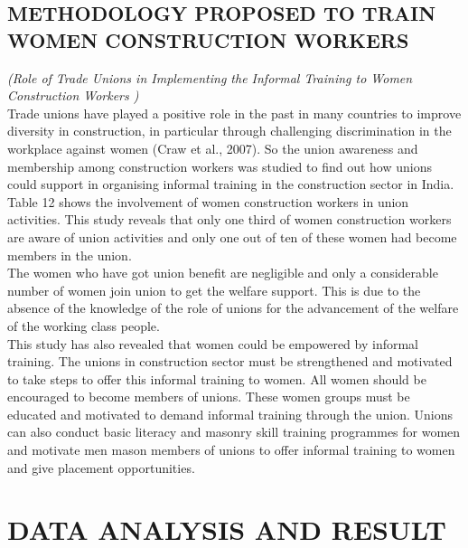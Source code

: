 \documentclass[12pt]{report}
\begin{document}
	
	\section{METHODOLOGY  PROPOSED  TO  TRAIN  WOMEN  CONSTRUCTION  WORKERS }
	\textit{(Role  of  Trade  Unions  in  Implementing  the  Informal  Training  to  Women  Construction Workers )}\\
	
	Trade  unions  have  played  a  positive  role  in  the  past  in  many  countries  to  improve diversity  in  construction,  in  particular  through  challenging  discrimination  in  the workplace  against  women  (Craw  et  al.,  2007).    So  the  union  awareness  and  membership among  construction  workers  was  studied  to  find  out  how  unions  could  support  in organising  informal  training  in  the  construction  sector  in  India.  Table  12  shows  the involvement  of  women  construction  workers  in  union  activities. This  study  reveals  that  only  one  third  of  women  construction  workers  are  aware of  union  activities  and  only  one  out  of  ten  of  these  women  had  become  members  in  the union. \\
	
	The  women  who  have  got  union  benefit  are  negligible  and  only  a  considerable number  of  women  join  union  to  get  the  welfare  support.  This  is  due  to  the  absence  of  the knowledge  of  the  role  of  unions  for  the  advancement  of  the  welfare  of  the  working  class people.  \\
	
	This  study  has  also  revealed  that  women  could  be  empowered  by  informal training.  The  unions  in  construction  sector  must  be  strengthened  and  motivated  to  take steps  to  offer  this  informal  training  to  women.  All  women  should  be  encouraged  to become  members  of  unions.  These  women  groups  must  be  educated  and  motivated  to demand  informal  training  through  the  union.  Unions  can  also  conduct  basic  literacy  and masonry  skill  training  programmes  for  women  and  motivate  men  mason  members  of unions  to  offer  informal  training  to  women  and  give  placement  opportunities. 
	
	
	\chapter{DATA ANALYSIS AND RESULT}
	
\end{document}
